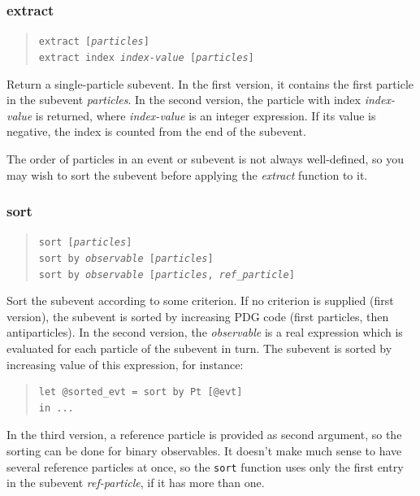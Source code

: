 \documentclass[12pt]{book}
\newcommand{\ttt}[1]{\texttt{#1}}
\begin{document}
\subsubsection{extract}
\begin{quote}
\begin{footnotesize}
  \ttt{extract [\textit{particles}]}   \\
  \ttt{extract index \textit{index-value} [\textit{particles}]}
\end{footnotesize}
\end{quote}
Return a single-particle subevent.  In the first version, it contains the
first particle in the subevent \textit{particles}.  In the second version, the
particle with index \textit{index-value} is returned, where
\textit{index-value} is an integer expression.  If its value is negative, the
index is counted from the end of the subevent.

The order of particles in an event or subevent is not always well-defined, so
you may wish to sort the subevent before applying the \textit{extract}
function to it.

\subsubsection{sort}
\begin{quote}
\begin{footnotesize}
   \ttt{sort [\textit{particles}]} \\
   \ttt{sort by \textit{observable} [\textit{particles}]}   \\
   \ttt{sort by \textit{observable} [\textit{particles}, \textit{ref\_particle}]}
\end{footnotesize}
\end{quote}
Sort the subevent according to some criterion.  If no criterion is supplied
(first version), the subevent is sorted by increasing PDG code (first
particles, then antiparticles).  In the second version, the
\textit{observable} is a real expression which is evaluated for each particle
of the subevent in turn.  The subevent is sorted by increasing value of this
expression, for instance:
\begin{quote}
\begin{footnotesize}
\begin{verbatim}
let @sorted_evt = sort by Pt [@evt]
in ...
\end{verbatim}
\end{footnotesize}
\end{quote}
In the third version, a reference particle is provided as second argument, so
the sorting can be done for binary observables.  It doesn't make much sense to
have several reference particles at once, so the \ttt{sort} function uses
only the first entry in the subevent \textit{ref-particle}, if it has more
than one.
\end{document}
